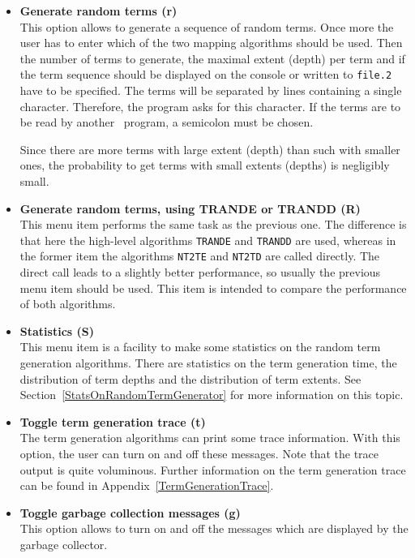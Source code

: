 \begin{itemize}
\item{\bf Generate random terms (r)}\\
   This option allows to generate a sequence of random terms.  Once
   more the user has to enter which of the two mapping algorithms
   should be used. Then the number of terms to generate, the maximal
   extent (depth) per term and if the term sequence should be displayed
   on the console or written to {\tt file.2} have to be specified.
   The terms will be separated by lines containing a single character.
   Therefore, the program asks for this character. If the terms are to
   be read by another \redux\ program, a semicolon must be chosen.

   Since there are more terms with large extent (depth) than such
   with smaller ones, the probability to get terms with small extents
   (depths) is negligibly small.

\item{\bf Generate random terms, using TRANDE or TRANDD (R)}\\
   This menu item performs the same task as the previous one. The
   difference is that here the high-level algorithms {\tt TRANDE} and
   {\tt TRANDD} are used, whereas in the former item the algorithms
   {\tt NT2TE} and {\tt NT2TD} are called directly. The direct call
   leads to a slightly better performance, so usually the previous menu
   item should be used. This item is intended to compare the
   performance of both algorithms.

\item{\bf Statistics (S)}\\
   This menu item is a facility to make some statistics on the random
   term generation algorithms. There are statistics on the term
   generation time, the distribution of term depths and the
   distribution of term extents.  See
   Section~\ref{StatsOnRandomTermGenerator} for more information on
   this topic.

\item{\bf Toggle term generation trace (t)}\\
   The term generation algorithms can print some trace information.
   With this option, the user can turn on and off these messages. Note
   that the trace output is quite voluminous. Further information on
   the term generation trace can be found in
   Appendix~\ref{TermGenerationTrace}.

\item{\bf Toggle garbage collection messages (g)}\\
   This option allows to turn on and off the messages which are
   displayed by the garbage collector.


\end{itemize}
